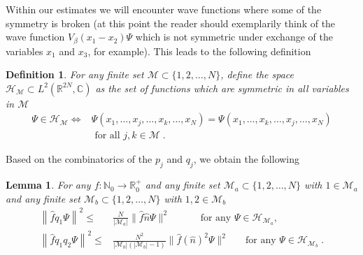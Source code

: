 \documentclass[11pt, english, american]{article}
\newcommand{\LZN}{L^2(\mathbb{R}^{2N},\mathbb{C})}
\newtheorem{lemma}[theorem]{Lemma}
\newtheorem{definition}[theorem] {Definition}
\begin{document}
Within our estimates we will encounter wave functions where some of the symmetry is broken (at this point the
reader should exemplarily think of the wave function
$V_\beta(x_1-x_2)\Psi$ which is not symmetric under exchange of the variables $x_1$ and $x_3$, for example). This leads to the following
definition
\begin{definition}
For any finite set $\mathcal{M}\subset\{1,2,\ldots,N\}$, define the space $\mathcal{H}_{\mathcal{M}}\subset\LZN$ as the set of
functions which are symmetric in all variables in $\mathcal{M}$
\begin{align*}\Psi\in \mathcal{H}_{\mathcal{M}}\Leftrightarrow& \Psi(x_1,\ldots,x_j,\ldots,x_k,\ldots,x_N)=\Psi(x_1,\ldots,x_k,\ldots,x_j,\ldots,x_N)\\&\text{ for all } j,k\in\mathcal{M}\;.
\end{align*}

\end{definition}
Based on the combinatorics of the $p_j$ and $q_j$, we obtain the following
\begin{lemma}\label{kombinatorikb}
For any $f:\mathbb{N}_0\to\mathbb{R}^+_0$ and any finite set $\mathcal{M}_a\subset \{1,2,\ldots,N\}$ with $1\in\mathcal{M}_a$
and any finite set $\mathcal{M}_b\subset\{1,2,\ldots,N\}$ with $1,2\in\mathcal{M}_b$
\begin{align}\label{komb1}
\left\| \widehat{f} q_1\Psi\right\|^2\leq& \frac{N}{|\mathcal{M}_a|}
\|\widehat{f}\widehat{n}\Psi\|^2\;\;\;\;\;\;\;\;\;\;\text{ for any }\Psi\in\mathcal{H}_{\mathcal{M}_a}
,
\\
\label{komb2} \left\| \widehat{f}
q_1 q_2\Psi\right\|^2\leq& \frac{N^2}{|\mathcal{M}_b|(|\mathcal{M}_b|-1)}
\|\widehat{f}(\widehat{n})^2\Psi\|^2\;\;\;\;\;\text{ for any }\Psi\in\mathcal{H}_{\mathcal{M}_b}\;.\end{align}
\end{lemma}
\end{document}
